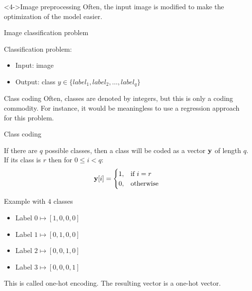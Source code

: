 \documentclass[xcolor=pdftex,dvipsnames,table,mathserif]{beamer}
\begin{document}
{\begin{columns}
\begin{column}
\begin{center}
      \end{center}
    \end{column}

  \end{columns}

  \pause

  \begin{alertblock}<4->{Image preprocessing}
    Often, the input image is modified to make the optimization of the model easier.
  \end{alertblock}

}


\begin{frame}{Image classification problem}

  Classification problem:
  \begin{itemize}
  \item Input: image
  \item Output: class $y \in \{ label_1, label_2, \ldots, label_q\}$
  \end{itemize}

  \begin{block}{Class coding}
    Often, classes are denoted by integers, but this is only a coding commodity. For instance, it would be meaningless to use a regression approach for this problem.
  \end{block}

\end{frame}

\begin{frame}{Class coding}

  If there are $q$ possible classes, then a class will be coded as a vector $\mathbf{y}$ of length $q$. If its class is $r$  then for $0 \leq i < q$:
  \[
  \mathbf{y}[i] =
  \begin{cases}
    1, & \text{if}\ i=r \\
    0, & \text{otherwise}
  \end{cases}
  \]

  \begin{block}{Example with $4$ classes}
    \begin{itemize}
    \item
      Label $0 \longmapsto [1,0,0,0]$
    \item
      Label $1 \longmapsto [0,1,0,0]$
    \item
      Label $2 \longmapsto [0,0,1,0]$
    \item
      Label $3 \longmapsto [0,0,0,1]$
    \end{itemize}
  \end{block}

  This is called \alert{one-hot encoding}. The resulting vector is a one-hot vector.

\end{frame}
\end{document}
